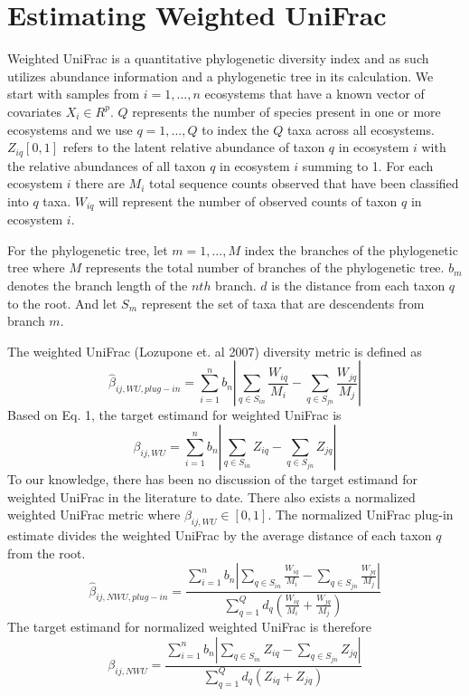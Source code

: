 \documentclass{article}
\begin{document}
\section{Estimating Weighted UniFrac}

Weighted UniFrac is a quantitative phylogenetic diversity index and as such utilizes abundance information and a phylogenetic tree in its calculation. We start with samples from $i = 1,..., n$ ecosystems that have a known vector of covariates $X_i \in R^p$. $Q$ represents the number of species present in one or more ecosystems and we use $q = 1,...,Q$ to index the $Q$ taxa across all ecosystems. $Z_{iq} [0,1]$ refers to the latent relative abundance of taxon $q$ in ecosystem $i$ with the relative abundances of all taxon $q$ in ecosystem $i$ summing to 1. For each ecosystem $i$ there are $M_i$ total sequence counts observed that have been classified into $q$ taxa. $W_{iq}$ will represent the number of observed counts of taxon $q$ in ecosystem $i$.

For the phylogenetic tree, let $m = 1,..., M$ index the branches of the phylogenetic tree where $M$ represents the total number of branches of the phylogenetic tree. $b_m$ denotes the branch length of the $nth$ branch. $d$ is the distance from each taxon $q$ to the root. And let $S_m$ represent the set of taxa that are descendents from branch $m$.

The weighted UniFrac (Lozupone et. al 2007) diversity metric is defined as
\begin{equation}
    \hat{\beta}_{ij,WU,plug-in}=\sum_{i=1}^n b_n |\sum_{q \in S_{in}} \frac{W_{iq}}{M_i}-\sum_{q \in S_{jn}} \frac{W_{jq}}{M_j}|
\end{equation}
Based on Eq. 1, the target estimand for weighted UniFrac is
\begin{equation}
    \beta_{ij,WU}=\sum_{i=1}^n b_n |\sum_{q \in S_{in}} Z_{iq} -\sum_{q \in S_{jn}} Z_{jq}|
\end{equation}
To our knowledge, there has been no discussion of the target estimand for weighted UniFrac in the literature to date. There also exists a normalized weighted UniFrac metric where $\beta_{ij,WU} \in [0,1]$.  The normalized UniFrac plug-in estimate divides the weighted UniFrac by the average distance of each taxon $q$ from the root.
\begin{equation}\label{eq:plugin}
    \hat{\beta}_{ij,NWU,plug-in}=\frac{\sum_{i=1}^n b_n |\sum_{q \in S_{in}} \frac{W_{iq}}{M_i}-\sum_{q \in S_{jn}} \frac{W_{jq}}{M_j}|}{\sum_{q=1}^Q d_q (\frac{W_{iq}}{M_i}+\frac{W_{jq}}{M_j})}
\end{equation}
The target estimand for normalized weighted UniFrac is therefore
\begin{equation}
    \beta_{ij,NWU}=\frac{\sum_{i=1}^n b_n |\sum_{q \in S_{in}} Z_{iq}-\sum_{q \in S_{jn}} Z_{jq}|}{\sum_{q=1}^Q d_q (Z_{iq}+Z_{jq})}
\end{equation}
\end{document}
